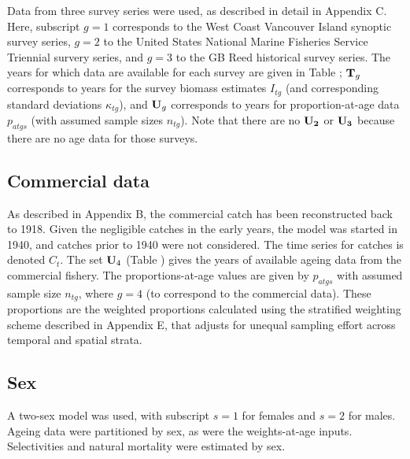 Data from three survey series were used, as described in detail in Appendix C. Here, subscript $g=1$ corresponds to the West Coast Vancouver Island synoptic survey series, $g=2$ to the United States National Marine Fisheries Service Triennial survery series, and $g=3$ to the GB Reed historical survey series. The years for which data are available for each survey are given in Table ; ${\bf T}_g$ corresponds to years for the survey biomass estimates $I_{tg}$ (and corresponding standard deviations $\kappa_{tg}$), and ${\bf U}_g$ corresponds to years for proportion-at-age data $p_{atgs}$ (with assumed sample sizes $n_{tg}$). Note that there are no ${\bf U_2}$ or ${\bf U_3}$ because there are no age data for those surveys.


\subsection{Commercial data}

As described in Appendix B, the commercial catch has been reconstructed back to 1918. Given the negligible catches in the early years, the model was started in 1940, and catches prior to 1940 were not considered. The time series for catches is denoted $C_t$. The set ${\bf U}_4$ (Table ) gives the years of available ageing data from the commercial fishery. The proportions-at-age values are given by $p_{atgs}$ with assumed sample size $n_{tg}$, where $g=4$ (to correspond to the commercial data). These proportions are the weighted proportions calculated using the stratified weighting scheme described in Appendix E, that adjusts for unequal sampling effort across temporal and spatial strata.

\subsection{Sex}

A two-sex model was used, with subscript $s=1$ for females and $s=2$ for males. Ageing data were partitioned by sex, as were the weights-at-age inputs. Selectivities and natural mortality were estimated by sex.

